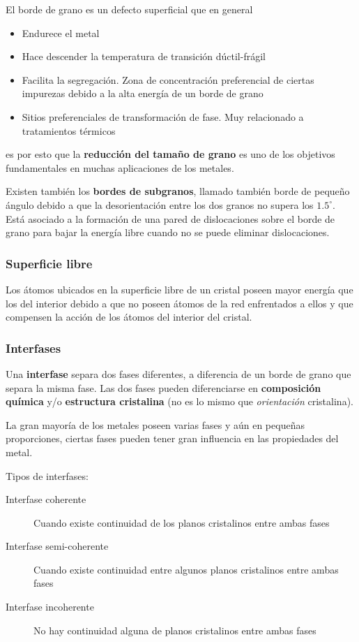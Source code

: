 El borde de grano es un defecto superficial que en general

\begin{itemize}
    \item Endurece el metal
    \item Hace descender la temperatura de transición dúctil-frágil
    \item Facilita la segregación. Zona de concentración preferencial de ciertas impurezas debido a la alta energía de un borde de grano
    \item Sitios preferenciales de transformación de fase. Muy relacionado a tratamientos térmicos
\end{itemize}

es por esto que la \textbf{reducción del tamaño de grano} es uno de los objetivos fundamentales en muchas aplicaciones de los metales.

Existen también los \textbf{bordes de subgranos}, llamado también borde de pequeño ángulo debido a que la desorientación entre los dos granos no supera los $1.5^\circ$. Está asociado a la formación de una pared de dislocaciones sobre el borde de grano para bajar la energía libre cuando no se puede eliminar dislocaciones.


\subsubsection{Superficie libre}

Los átomos ubicados en la superficie libre de un cristal poseen mayor energía que los del interior debido a que no poseen átomos de la red enfrentados a ellos y que compensen la acción de los átomos del interior del cristal.


\subsubsection{Interfases}

Una \textbf{interfase} separa dos fases diferentes, a diferencia de un borde de grano que separa la misma fase. Las dos fases pueden diferenciarse en \textbf{composición química} y/o \textbf{estructura cristalina} (no es lo mismo que \textit{orientación} cristalina).

La gran mayoría de los metales poseen varias fases y aún en pequeñas proporciones, ciertas fases pueden tener gran influencia en las propiedades del metal.

Tipos de interfases:

\begin{description}
	\item[Interfase coherente] Cuando existe continuidad de los planos cristalinos entre ambas fases
	\item[Interfase semi-coherente] Cuando existe continuidad entre algunos planos cristalinos entre ambas fases
	\item[Interfase incoherente] No hay continuidad alguna de planos cristalinos entre ambas fases  
\end{description}







